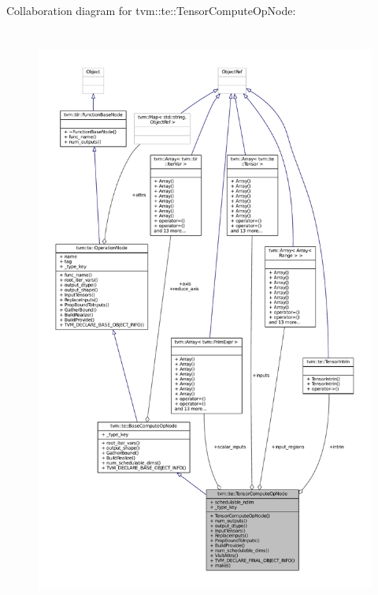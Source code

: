 Collaboration diagram for tvm\+:\+:te\+:\+:Tensor\+Compute\+Op\+Node\+:
\nopagebreak
\begin{figure}[H]
\begin{center}
\leavevmode
\includegraphics[height=550pt]{classtvm_1_1te_1_1TensorComputeOpNode__coll__graph}
\end{center}
\end{figure}
